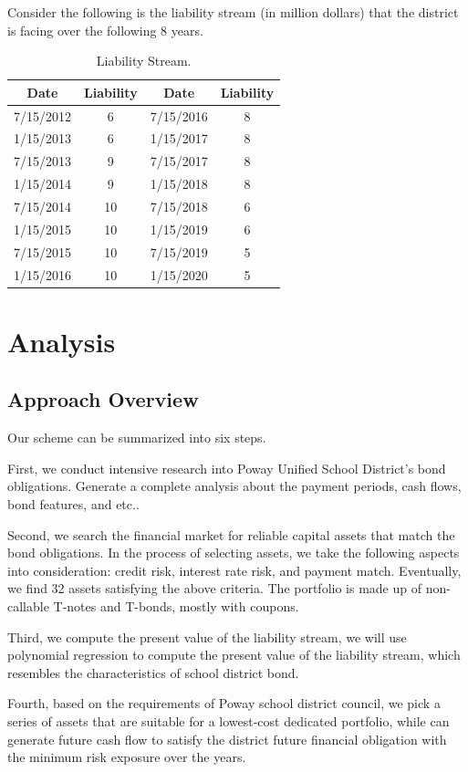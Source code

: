 \documentclass[oneside,12pt]{report}
\begin{document}
Consider the following is the liability stream (in million dollars) that the district is facing over the following 8 years.
\begin{table}[h]
\centering  
\begin{tabular}{cccc}
\hline
Date  &Liability  &Date  &Liability\\ \hline  
7/15/2012  &6  &7/15/2016  &8\\
1/15/2013  &6  &1/15/2017  &8\\ 
7/15/2013  &9  &7/15/2017  &8\\ 
1/15/2014  &9  &1/15/2018  &8\\ 
7/15/2014  &10 &7/15/2018  &6\\ 
1/15/2015  &10  &1/15/2019  &6\\ 
7/15/2015  &10  &7/15/2019  &5 \\ 
1/15/2016  &10  &1/15/2020  &5\\ \hline
\end{tabular}
\caption{Liability Stream.}
\end{table}

\chapter{Analysis}\label{}
%
\section{Approach Overview}
 Our scheme can be summarized into six steps. 

First, we conduct intensive research into Poway Unified School District's bond obligations. Generate a complete analysis about the payment periods, cash flows, bond features, and etc..

Second, we search the financial market for reliable capital assets that match the bond obligations. In the process of selecting assets, we take the following aspects into consideration: credit risk, interest rate risk, and payment match. Eventually, we find 32 assets satisfying the above criteria. The portfolio is made up of non-callable T-notes and T-bonds, mostly with coupons.

Third, we compute the present value of the liability stream, we will use polynomial regression to compute the present value of the liability stream, which resembles the characteristics of school district bond. 

Fourth, based on the requirements of Poway school district council, we pick a series of assets that are suitable for a lowest-cost dedicated portfolio, while can generate future cash flow to satisfy the district future financial obligation with the minimum risk exposure over the years.
\end{document}
